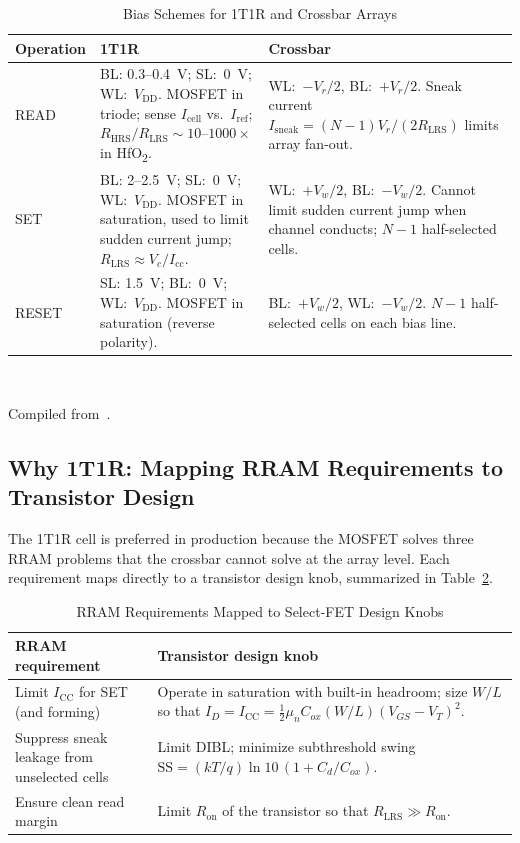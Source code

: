 \documentclass[lettersize,journal]{IEEEtran}
\begin{document}
\begin{table}[!t]
\caption{Bias Schemes for 1T1R and Crossbar Arrays\label{tab:bias}}
\centering
\footnotesize
\renewcommand{\arraystretch}{1.25}
\begin{tabular}{|p{0.55in}|p{2.85in}|p{2.85in}|}
\hline
\textbf{Operation} & \textbf{1T1R} & \textbf{Crossbar} \\
\hline
READ & BL: 0.3--0.4~V; SL:~0~V; WL:~$V_\mathrm{DD}$. MOSFET in triode; sense $I_\mathrm{cell}$ vs.~$I_\mathrm{ref}$; $R_\mathrm{HRS}/R_\mathrm{LRS}\!\sim\!10$--$1000\times$ in HfO\textsubscript{2}. & WL:~$-V_r/2$, BL:~$+V_r/2$. Sneak current $I_\mathrm{sneak}=(N{-}1)V_r/(2R_\mathrm{LRS})$ limits array fan-out. \\
\hline
SET & BL: 2--2.5~V; SL:~0~V; WL:~$V_\mathrm{DD}$. MOSFET in saturation, used to limit sudden current jump; $R_\mathrm{LRS}\!\approx\!V_c/I_\mathrm{cc}$. & WL:~$+V_w/2$, BL:~$-V_w/2$. Cannot limit sudden current jump when channel conducts; $N{-}1$ half-selected cells. \\
\hline
RESET & SL: 1.5~V; BL:~0~V; WL:~$V_\mathrm{DD}$. MOSFET in saturation (reverse polarity). & BL:~$+V_w/2$, WL:~$-V_w/2$. $N{-}1$ half-selected cells on each bias line. \\
\hline
\end{tabular}
\\[2pt]
\raggedright Compiled from~\cite{ref_niu2016,ref_ielmini2016}.
\end{table}

\subsection{Why 1T1R: Mapping RRAM Requirements to Transistor Design}
The 1T1R cell is preferred in production because the MOSFET solves three RRAM problems that the crossbar cannot solve at the array level. Each requirement maps directly to a transistor design knob, summarized in Table~\ref{tab:knobs}.

\begin{table}[!t]
\caption{RRAM Requirements Mapped to Select-FET Design Knobs\label{tab:knobs}}
\centering
\footnotesize
\renewcommand{\arraystretch}{1.2}
\begin{tabular}{|p{0.95in}|p{2.15in}|}
\hline
\textbf{RRAM requirement} & \textbf{Transistor design knob} \\
\hline
Limit $I_\mathrm{CC}$ for SET (and forming) & Operate in saturation with built-in headroom; size $W/L$ so that $I_D = I_\mathrm{CC} = \tfrac{1}{2}\mu_n C_{ox}(W/L)(V_{GS}-V_T)^2$. \\
\hline
Suppress sneak leakage from unselected cells & Limit DIBL; minimize subthreshold swing $\mathrm{SS}=(kT/q)\ln 10\,(1+C_d/C_{ox})$. \\
\hline
Ensure clean read margin & Limit $R_\mathrm{on}$ of the transistor so that $R_\mathrm{LRS}\gg R_\mathrm{on}$. \\
\hline
\end{tabular}
\end{table}
\end{document}

